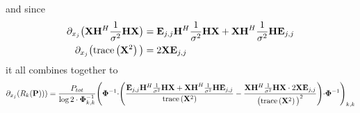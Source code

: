 and since
\begin{align}
	\partial_{x_j}\bigr(\mathbf{X}\mathbf{H}^H\frac{1}{\sigma^2}\mathbf{H}\mathbf{X}\bigl) &= \mathbf{E}_{j,j}\mathbf{H}^H\frac{1}{\sigma^2}\mathbf{HX} + \mathbf{XH}^H\frac{1}{\sigma^2}\mathbf{HE}_{j,j}\\
	\partial_{x_j}\bigr(\text{trace}\left(\mathbf{X}^2\right)\bigl) &= 2\mathbf{XE}_{j,j}
\end{align}
it all combines together to
\begin{equation}
	\partial_{x_j}(R_k(\mathbf{P}))) = \frac{P_{tot}}{\log{2}\cdot\mathbf{\Phi}_{k,k}^{-1}} \Biggr(\mathbf{\Phi}^{-1} \cdot \Biggr(\frac{\mathbf{E}_{j,j}\mathbf{H}^H\frac{1}{\sigma^2}\mathbf{HX} + \mathbf{XH}^H\frac{1}{\sigma^2}\mathbf{HE}_{j,j}}{\text{trace}\left(\mathbf{X}^2\right)} - \frac{\mathbf{X}\mathbf{H}^H\frac{1}{\sigma^2}\mathbf{H}\mathbf{X} \cdot 2\mathbf{XE}_{j,j}}{\bigr(\text{trace}\left(\mathbf{X}^2\right)\bigl)^2}\Biggl) \cdot \mathbf{\Phi}^{-1}\Biggl)_{k,k}
\end{equation}

